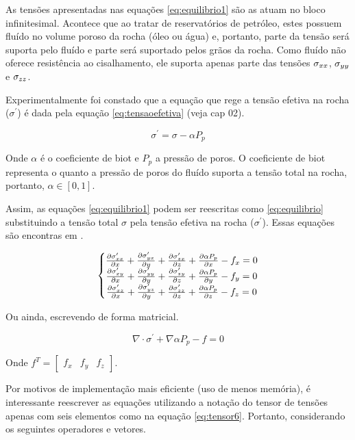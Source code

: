 As tensões apresentadas nas equações \ref{eq:equilibrio1} são as atuam no bloco infinitesimal. Acontece que ao tratar de reservatórios de petróleo, estes possuem fluído no volume poroso da rocha (óleo ou água) e, portanto, parte da tensão será suporta pelo fluído e parte será suportado pelos grãos da rocha. Como fluído não oferece resistência ao cisalhamento, ele suporta apenas parte das tensões $\sigma_{xx}$, $\sigma_{yy}$ e $\sigma_{zz}$.

Experimentalmente foi constado que a equação que rege a tensão efetiva na rocha ($\sigma^\prime$) é dada pela equação \ref{eq:tensaoefetiva} (veja \cite{ResGeomec} cap 02).

\begin{equation}
\label{eq:tensaoefetiva}
    \sigma^\prime = \sigma - \alpha P_p
\end{equation}

Onde $\alpha$ é o coeficiente de biot e $P_p$ a pressão de poros. O coeficiente de biot representa o quanto a pressão de poros do fluído suporta a tensão total na rocha, portanto, $\alpha \in [0,1]$.

Assim, as equações \ref{eq:equilibrio1} podem ser reescritas como \ref{eq:equilibrio} substituindo a tensão total $\sigma$ pela tensão efetiva na rocha ($\sigma^\prime$). Essas equações são encontras em \cite{CompGeomec}.



\begin{equation}
\label{eq:equilibrio}
\left\{\begin{matrix}
\dx[\sxx]  + \dy[\syx] + \dz[\szx] + \dx[\alpha P_p] - f_x   = 0
\\
\dx[\sxy]  + \dy[\syy] + \dz[\szy] + \dy[\alpha P_p]  - f_y   = 0
\\
\dx[\sxz]  + \dy[\syz] + \dz[\szz] + \dz[\alpha P_p] - f_z   = 0
\end{matrix}\right.
\end{equation}

Ou ainda, escrevendo de forma matricial.

\begin{equation}
\label{eq:equilibrio_matriz}
\nabla \cdot \sigma^\prime + \nabla \alpha P_p - f = 0
\end{equation}

Onde $f^T=\begin{bmatrix}f_x & f_y & f_z\end{bmatrix}$.


Por motivos de implementação mais eficiente (uso de menos memória), é interessante reescrever as equações utilizando a notação do tensor de tensões apenas com seis elementos como na equação \ref{eq:tensor6}. Portanto, considerando os seguintes operadores e vetores.

